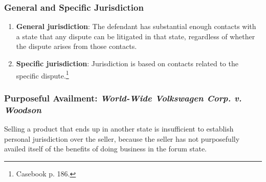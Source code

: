 \subsubsection{General and Specific Jurisdiction}

\begin{enumerate}
    \item \textbf{General jurisdiction}: The defendant has substantial enough 
    contacts with a state that any dispute can be litigated in that state, 
    regardless of whether the dispute arises from those contacts.
    \item \textbf{Specific jurisdiction}: Jurisdiction is based on contacts 
    related to the specific dispute.\footnote{Casebook p. 186.}
\end{enumerate}

\subsubsection{Purposeful Availment: \emph{World-Wide Volkswagen Corp. v. 
Woodson}}

Selling a product that ends up in another state is insufficient to establish 
personal jurisdiction over the seller, because the seller has not purposefully 
availed itself of the benefits of doing business in the forum state.

